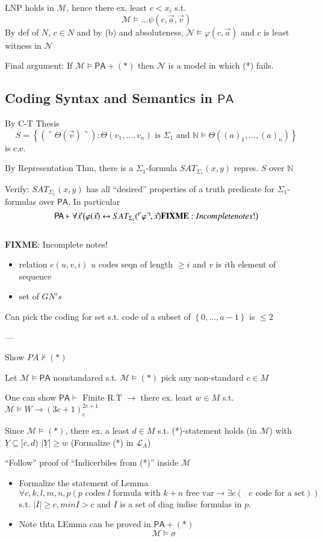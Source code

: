 \documentclass[12pt]{article}
\newcommand{\Nat}{\ensuremath{\mathbb{N}}}
\newcommand{\PA}{\ensuremath{\mathsf{PA}}}
\newcommand{\proves}{\vdash}
\newcommand{\gn}[1]{\ulcorner #1 \urcorner}
\newcommand{\fixme}{\\ \textbf{FIXME}: Incomplete notes!}
\begin{document}
LNP holds in $\mathcal{M}$, hence there ex. least $c < x_i$ s.t.
\[
\mathcal{M} \models \dots \psi(c, \vec{a}, \vec{v})
\]
By def of $N$, $c \in N$ and by (b) and absoluteness,
$\mathcal{N} \models \varphi(c, \vec{a})$ and $c$ is least witness in $\mathcal{N}$

Final argument: If $\mathcal{M} \models \PA + (*)$
then $\mathcal{N}$ is a model in which (*) fails.

\subsection{
Coding Syntax and Semantics in $\PA$
}

By C-T Thesis
\[
S = \left\{ ( \gn{\Theta(\vec{v})}) :
\Theta(v_1, \dots, v_n) \text{ is } \Sigma_1 \text{ and }
\Nat \models \Theta( (a)_1, \dots, (a)_n)\right\}
\]
is c.e.

By Representation Thm, there is a $\Sigma_1$-formula $SAT_{\Sigma_1}(x,y)$
repres. $S$ over $\Nat$

Verify:
$SAT_{\Sigma_1}(x,y)$ has all ``desired'' properties of a truth predicate for
$\Sigma_1$-formulas over $\PA$.
In particular
\[
\PA \proves \forall \vec{x} \left( \varphi(\vec{x}) \leftrightarrow
SAT_{\Sigma_1}(\gn{\varphi}, \vec{x})
\fixme
\right)
\]
\fixme

\begin{itemize}
  \item relation $e(u,v,i)$
    $u$ codes seqn of length $\ge i$ and $v$ is $i$th element of sequence
  \item set of $GN's$
\end{itemize}
Can pick the coding for set s.t. code of a subset of $\left\{ 0, \dots, a-1 \right\}$ is $\le 2$

---

Show $PA \not \proves (*)$

Let $\mathcal{M} \models \PA$ nonstandared s.t. $\mathcal{M} \models (*)$
pick any non-standard $c \in M$

One can show $\PA \proves \text{ Finite R.T}$
$ \rightarrow $ there ex. least $w \in M$ s.t.
$\mathcal{M} \models W \rightarrow \left( 3c + 1 \right)^{2c+1}_c$

Since $\mathcal{M} \models (*)$, there ex. a least $d \in M$ s.t.
(*)-statement holds (in $\mathcal{M}$) with $\underline{Y} \subseteq [c,d)$
$|\underline{Y}| \ge w$
(Formalize (*) in $\mathcal{L}_A$)

``Follow'' proof of ``Indicerbiles from (*)'' inside $\mathcal{M}$
\begin{itemize}                 %
 \item Formalize the statement of Lemma
   \[
   \forall c,k,l,m,n,p (p \text{ codes $l$ formula with $k + n$ free var}
   \rightarrow \exists e (\text{ $e$ code for a set}))
   \]
   s.t. $|I| \ge c, min I > c$
   and $I$ is a set of diag indisc formulas in $p$.

 \item  Note thta LEmma can be proved in $\PA + (*)$
   \[
   \mathcal{M} \models \sigma
   \]
\end{itemize}
\end{document}
